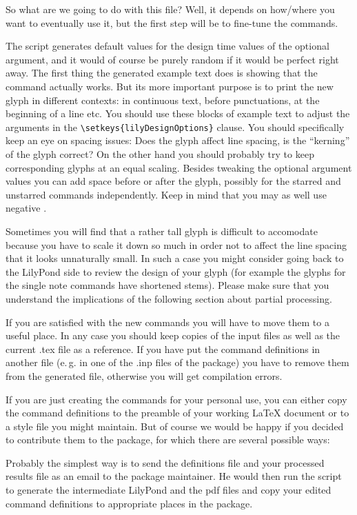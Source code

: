 \documentclass{article}
\begin{document}
So what are we going to do with this file?
Well, it depends on how/where you want to eventually use it, but the first step will be to fine-tune the commands.

The script generates default values for the design time values of the optional argument, and it would of course be purely random if it would be perfect right away.
The first thing the generated example text does is showing that the command actually works.
But its more important purpose is to print the new glyph in different contexts: in continuous text, before punctuations, at the beginning of a line etc.
You should use these blocks of example text to adjust the arguments in the \verb|\setkeys{lilyDesignOptions}| clause.
You should specifically keep an eye on spacing issues: Does the glyph affect line spacing, is the “kerning” of the glyph correct?
On the other hand you should probably try to keep corresponding glyphs at an equal scaling.
Besides tweaking the optional argument values you can add space before or after the glyph, possibly for the starred and unstarred commands independently.
Keep in mind that you may as well use negative .

Sometimes you will find that a rather tall glyph is difficult to accomodate because you have to scale it down so much in order not to affect the line spacing that it looks unnaturally small.
In such a case you might consider going back to the LilyPond side to review the design of your glyph (for example the glyphs for the single note commands have shortened stems).
Please make sure that you understand the implications of the following section about partial processing.

\medskip
If you are satisfied with the new commands you will have to move them to a useful place.
In any case you should keep copies of the input files as well as the current .tex file as a reference.
If you have put the command definitions in another file (e.\,g. in one of the .inp files of the \lilyglyphs package) you have to remove them from the generated file, otherwise you will get compilation errors.

If you are just creating the commands for your personal use, you can either copy the command definitions to the preamble of your working \LaTeX{} document or to a style file you might maintain.
But of course we would be happy if you decided to contribute them to the package, for which there are several possible ways:

Probably the simplest way is to send the definitions file and your processed results file as an email to the package maintainer. He would then run the script to generate the intermediate LilyPond and the pdf files and copy your edited command definitions to appropriate places in the package.
\end{document}

